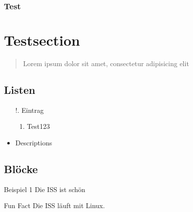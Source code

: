 
\begin{frame}
    \frametitle{Test}


    \section{Testsection}\label{sec:testsection}

    \begin{quote}
        Lorem ipsum dolor sit amet, consectetur adipisicing elit
    \end{quote}


    \subsection{Listen}\label{subsec:Listen}
    \begin{itemize}
        \item[!.] Eintrag
        \begin{enumerate}
            \item Test123
        \end{enumerate}
        \item Descriptions
    \end{itemize}

    \subsection{Blöcke}\label{subsec:Blocke}
    \begin{exampleblock}{Beispiel 1}
        Die ISS ist schön
    \end{exampleblock}
    \begin{alertblock}{Fun Fact}
        Die ISS läuft mit Linux.
    \end{alertblock}

\end{frame}